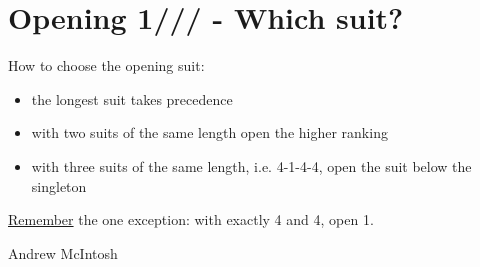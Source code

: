 \documentclass[14pt]{extarticle}
\begin{document}
\newpage
\addtocounter{page}{1}
\vspace*{\fill}
\begingroup
\centering
\section*{Opening 1\textcolor{ForestGreen}{}/\textcolor{orange}{}/\textcolor{red}{}/\textcolor{blue}{} - Which suit?} 
\endgroup

\noindent How to choose the opening suit:\\
\begin{itemize}
\item the longest suit takes precedence
\item with two suits of the same length open the higher ranking \item with three suits of the same length, i.e. 4-1-4-4, open the suit below the singleton
\end{itemize}

\noindent \smallpencil \underline{Remember} the one exception: with exactly 4\textcolor{red}{} and 4\textcolor{blue}{}, open 1\textcolor{red}{}.

\vspace*{\fill}
\begin{flushbottom}
 \begin{center}
 \tiny
 \textcopyright Andrew McIntosh
\end{center}
\end{flushbottom}
\end{document}
